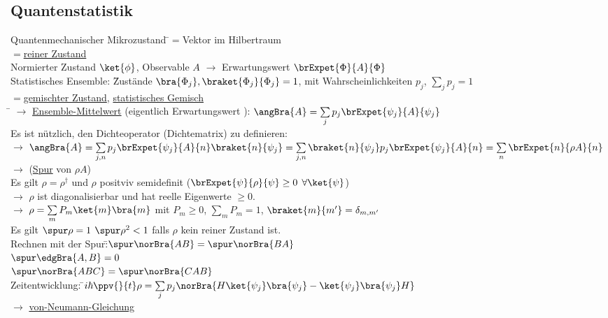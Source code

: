 \subsection{Quantenstatistik}
\begin{tabbing}
Quantenmechanischer Mikrozustand \=$=$Vektor im Hilbertraum\\
\>$=$\underline{reiner Zustand}\\
Normierter Zustand $\ket{\phi}$, Observable $A$ $\rightarrow$ Erwartungswert $\brExpet{\Phi}{A}{\Phi}$\\
Statistisches Ensemble: \= Zustände $\bra{\Phi_j}, \braket{\Phi_j}{\Phi_j} = 1$, mit Wahrscheinlichkeiten $p_j$, $\sum\limits_j p_j = 1$\\
\>$=$\underline{gemischter Zustand}, \underline{statistisches Gemisch}\\
\hspace{4em} \= \kill
$\rightarrow$\> \underline{Ensemble-Mittelwert} (eigentlich \glqq Erwartungswert \grqq): $\angBra{A} = \sum\limits_j p_j \brExpet{\psi_j}{A}{\psi_j}$\\
Es ist nützlich, den Dichteoperator (Dichtematrix) zu definieren: \\
$\rightarrow$\> $\angBra{A} = \sum\limits_{j,n} p_j \brExpet{\psi_j}{A}{n}\braket{n}{\psi_j} = \sum\limits_{j,n} \braket{n}{\psi_j}p_j \brExpet{\psi_j}{A}{n} = \sum\limits_n \brExpet{n}{\rho A}{n}$\\
$\rightarrow$\>  (\underline{Spur} von $\rho A$)\\
Es gilt $\rho = \rho^{\dagger}$ und $\rho$ positviv semidefinit ($\brExpet{\psi}{\rho}{\psi} \geq 0$ $\forall \ket{\psi}$)\\
$\rightarrow$\> $\rho$ ist diagonalisierbar und hat reelle Eigenwerte $\geq 0$.\\
$\rightarrow$\> $\rho = \sum\limits_m P_m\ket{m}\bra{m}$ mit $P_m \geq 0$, $\sum\limits_m P_m = 1$, $\braket{m}{m'} = \delta_{m,m'}$\\
Es gilt $\spur \rho =1$ $\spur \rho^2 < 1$ falls $\rho$ kein reiner Zustand ist.\\
Rechnen mit der Spur:\=$\spur\norBra{AB} = \spur\norBra{BA}$\\
\> $\spur\edgBra{A,B} = 0$\\
\> $\spur\norBra{ABC} = \spur\norBra{CAB}$\\
Zeitentwicklung: \=$i \hbar \ppv{}{t} \rho = \sum\limits_j p_j \norBra{H\ket{\psi_j}\bra{\psi_j} - \ket{\psi_j}\bra{\psi_j}H}$\\
$\rightarrow$\>  \underline{von-Neumann-Gleichung}
\end{tabbing}
